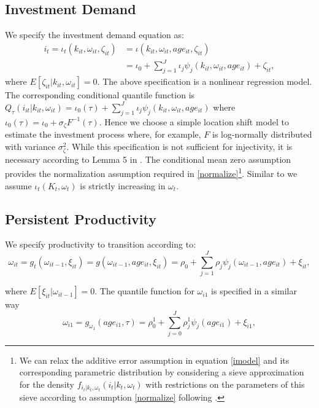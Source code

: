 \documentclass{article}
\begin{document}
\subsection{Investment Demand}
We specify the investment demand equation as:
\begin{equation}\label{imodel}
\begin{split}
i_{t}=\iota_{t}(k_{it}, \omega_{it}, \zeta_{it})&=\iota(k_{it}, \omega_{it}, age_{it}, \zeta_{it})\\
&=\iota_{0}+\sum_{j=1}^{J}\iota_{j}\psi_{j}(k_{it}, \omega_{it}, age_{it})+\zeta_{it},
\end{split}
\end{equation}
where $E[\zeta_{it}|k_{it}, \omega_{it}]=0$. The above specification is a nonlinear regression model. The corresponding conditional quantile function is $Q_{\tau}(i_{it}|k_{it}, \omega_{it})=\iota_{0}(\tau)+\sum_{j=1}^{J}\iota_{j}\psi_{j}(k_{it}, \omega_{it}, age_{it})$ where $\iota_{0}(\tau)=\iota_{0}+\sigma_{\zeta}F^{-1}(\tau)$. Hence we choose a simple location shift model to estimate the investment process where, for example, $F$ is log-normally distributed with variance $\sigma^{2}_{\zeta}$. While this specification is not sufficient for injectivity, it is necessary according to Lemma 5 in \cite{Hu2012}. The conditional mean zero assumption provides the normalization assumption required in \eqref{normalize}\footnote{We can relax the additive error assumption in equation \eqref{imodel} and its corresponding parametric distribution by considering a sieve approximation for the density $f_{i_{t}|k_{t}, \omega_{t}}(i_{t}|k_{t}, \omega_{t})$ with restrictions on the parameters of this sieve according to assumption \eqref{normalize} following \cite{Hu2008}.}. Similar to \cite{Olley1996} we assume $\iota_{t}(K_{t}, \omega_{t})$ is strictly increasing in $\omega_{t}$.\\

\subsection{Persistent Productivity}
We specify productivity to transition according to:
\begin{equation}\label{omegamodel}
\omega_{it}=g_{t}(\omega_{it-1}, \xi_{it})=g(\omega_{it-1}, age_{it}, \xi_{it})=\rho_{0}+\sum_{j=1}^{J}\rho_{j}\psi_{j}(\omega_{it-1}, age_{it})+\xi_{it},
\end{equation}


\noindent where $E[\xi_{it}|\omega_{it-1}]=0$. The quantile function for $\omega_{i1}$ is specified in a similar way
\begin{equation}{}
\label{omega1model}
\omega_{i1}=g_{\omega_{1}}(age_{i1}, \tau)=\rho^{1}_{0}+\sum_{j=0}^{J}\rho_{j}^{1}\psi_{j}(age_{i1})+\xi_{i1},
\end{equation}
\end{document}
